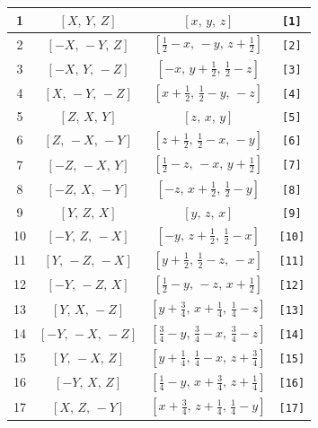 \documentclass[fleqn,8pt]{jsarticle}
\begin{document}
\begin{longtable}{cccc}
1 & $\left[ X,\, Y,\, Z \right]$ & $\left[ x,\, y,\, z \right]$ & {\tt [1]} \\ \hline
2 & $\left[ - X,\, - Y,\, Z \right]$ & $\left[ \frac{1}{2} - x,\, - y,\, z + \frac{1}{2} \right]$ & {\tt [2]} \\ \hline
3 & $\left[ - X,\, Y,\, - Z \right]$ & $\left[ - x,\, y + \frac{1}{2},\, \frac{1}{2} - z \right]$ & {\tt [3]} \\ \hline
4 & $\left[ X,\, - Y,\, - Z \right]$ & $\left[ x + \frac{1}{2},\, \frac{1}{2} - y,\, - z \right]$ & {\tt [4]} \\ \hline
5 & $\left[ Z,\, X,\, Y \right]$ & $\left[ z,\, x,\, y \right]$ & {\tt [5]} \\ \hline
6 & $\left[ Z,\, - X,\, - Y \right]$ & $\left[ z + \frac{1}{2},\, \frac{1}{2} - x,\, - y \right]$ & {\tt [6]} \\ \hline
7 & $\left[ - Z,\, - X,\, Y \right]$ & $\left[ \frac{1}{2} - z,\, - x,\, y + \frac{1}{2} \right]$ & {\tt [7]} \\ \hline
8 & $\left[ - Z,\, X,\, - Y \right]$ & $\left[ - z,\, x + \frac{1}{2},\, \frac{1}{2} - y \right]$ & {\tt [8]} \\ \hline
9 & $\left[ Y,\, Z,\, X \right]$ & $\left[ y,\, z,\, x \right]$ & {\tt [9]} \\ \hline
10 & $\left[ - Y,\, Z,\, - X \right]$ & $\left[ - y,\, z + \frac{1}{2},\, \frac{1}{2} - x \right]$ & {\tt [10]} \\ \hline
11 & $\left[ Y,\, - Z,\, - X \right]$ & $\left[ y + \frac{1}{2},\, \frac{1}{2} - z,\, - x \right]$ & {\tt [11]} \\ \hline
12 & $\left[ - Y,\, - Z,\, X \right]$ & $\left[ \frac{1}{2} - y,\, - z,\, x + \frac{1}{2} \right]$ & {\tt [12]} \\ \hline
13 & $\left[ Y,\, X,\, - Z \right]$ & $\left[ y + \frac{3}{4},\, x + \frac{1}{4},\, \frac{1}{4} - z \right]$ & {\tt [13]} \\ \hline
14 & $\left[ - Y,\, - X,\, - Z \right]$ & $\left[ \frac{3}{4} - y,\, \frac{3}{4} - x,\, \frac{3}{4} - z \right]$ & {\tt [14]} \\ \hline
15 & $\left[ Y,\, - X,\, Z \right]$ & $\left[ y + \frac{1}{4},\, \frac{1}{4} - x,\, z + \frac{3}{4} \right]$ & {\tt [15]} \\ \hline
16 & $\left[ - Y,\, X,\, Z \right]$ & $\left[ \frac{1}{4} - y,\, x + \frac{3}{4},\, z + \frac{1}{4} \right]$ & {\tt [16]} \\ \hline
17 & $\left[ X,\, Z,\, - Y \right]$ & $\left[ x + \frac{3}{4},\, z + \frac{1}{4},\, \frac{1}{4} - y \right]$ & {\tt [17]} \\ \hline

\end{longtable}
\end{document}
